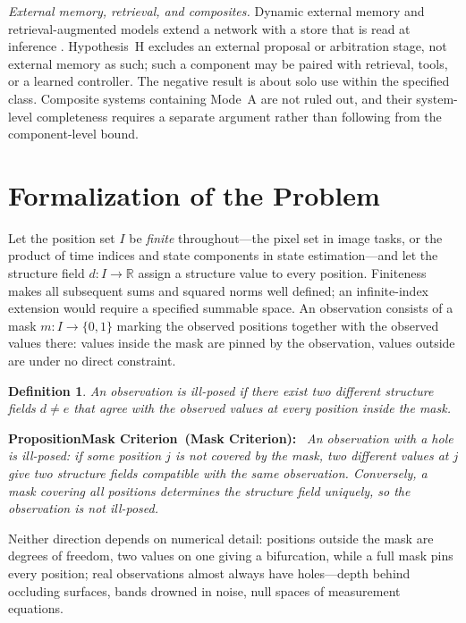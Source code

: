 \documentclass[twoside,11pt]{article}
\newtheorem{defn}{Definition}
\newenvironment{uprop}[1][]{\par\medskip\noindent\textbf{Proposition\ifx\relax#1\relax\else\ (#1)\fi:}\ \itshape}{\par\medskip} %
\begin{document}
\emph{External memory, retrieval, and composites.}
Dynamic external memory and retrieval-augmented models extend a network with a store that is read at inference \citep{graves2016,lewis2020,khandelwal2020,borgeaud2022}. Hypothesis~H excludes an external proposal or arbitration stage, not external memory as such; such a component may be paired with retrieval, tools, or a learned controller. The negative result is about solo use within the specified class. Composite systems containing Mode~A are not ruled out, and their system-level completeness requires a separate argument rather than following from the component-level bound.



\section{Formalization of the Problem}
\label{ch:formalize}%

Let the position set $I$ be \emph{finite} throughout---the pixel set in image tasks, or the product of time indices and state components in state estimation---and let the structure field $d : I \to \mathbb{R}$ assign a structure value to every position. Finiteness makes all subsequent sums and squared norms well defined; an infinite-index extension would require a specified summable space. An observation consists of a mask $m : I \to \{0,1\}$ marking the observed positions together with the observed values there: values inside the mask are pinned by the observation, values outside are under no direct constraint.

\begin{defn}
An observation is \emph{ill-posed} if there exist two different structure fields $d \neq e$ that agree with the observed values at every position inside the mask.
\end{defn}

\begin{uprop}[Mask Criterion]
An observation with a hole is ill-posed: if some position $j$ is not covered by the mask, two different values at $j$ give two structure fields compatible with the same observation. Conversely, a mask covering all positions determines the structure field uniquely, so the observation is not ill-posed.
\end{uprop}

Neither direction depends on numerical detail: positions outside the mask are degrees of freedom, two values on one giving a bifurcation, while a full mask pins every position; real observations almost always have holes---depth behind occluding surfaces, bands drowned in noise, null spaces of measurement equations.
\end{document}
